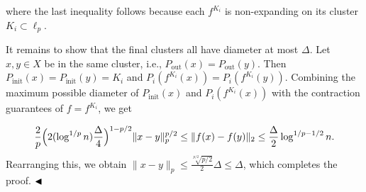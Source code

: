\documentclass[10pt,a4paper]{amsart}
\begin{document}
where the last inequality follows because each $f^{K_{i}}$ is non-expanding on its cluster $K_{i}\subset\ell_{p}$.
\par
\par
It remains to show that the final clusters all have diameter at most $\Delta$. Let $x,y\in X$ be in the same cluster, i.e., $P_{\text{out}}(x)=P_{\text{out}}(y)$. Then $P_{\text{init}}(x)=P_{\text{init}}(y)=K_{i}$ and $P_{i}(f^{K_{i}}(x))=P_{i}(f^{K_{i}}(y))$. Combining the maximum possible diameter of $P_{\text{init}}(x)$ and $P_{i}(f^{K_{i}}(x))$ with the contraction guarantees of $f=f^{K_{i}}$, we get
\par
\[\begin{aligned}
\frac{2}{p}\Big{(}2(\log^{1/p}{n})\frac{\Delta}{4}\Big{)}^{1-p/2}\|x-y\|_{p}^{%
p/2}\leq\|f(x)-f(y)\|_{2}\leq\frac{\Delta}{2}\log^{1/p-1/2}{n}.
\end{aligned}\]
Rearranging this, we obtain $\|x-y\|_{p}\leq\frac{\sqrt[p/2]{p/2}}{2}\Delta\leq\Delta$, which completes the proof. $\hfill\blacktriangleleft$
\par
\par
\par
\end{document}
